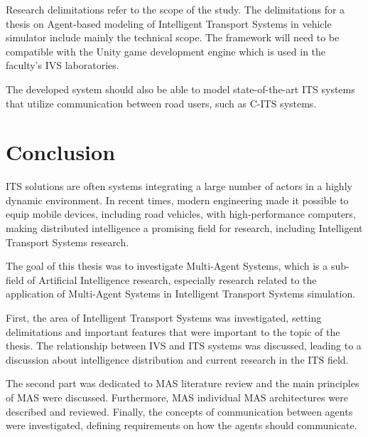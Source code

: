 \documentclass[titlepage, 12pt]{article}
\begin{document}
Research delimitations refer to the scope of the study. The delimitations
for a thesis on Agent-based modeling of Intelligent Transport Systems in vehicle simulator include mainly 
the technical scope. The framework will need to be compatible with the Unity game development engine which 
is used in the faculty's IVS laboratories. 

The developed system should also be able to model state-of-the-art ITS systems that utilize communication between 
road users, such as C-ITS systems. 



















\clearpage

\section{Conclusion}

ITS solutions are often systems integrating a large number of 
actors in a highly dynamic environment. In recent times, modern engineering made it possible 
to equip mobile devices, including road vehicles, with high-performance computers, making 
distributed intelligence a promising field for research, including Intelligent Transport Systems 
research.

The goal of this thesis was to investigate Multi-Agent Systems, which is a sub-field of Artificial Intelligence 
research, especially research related to the application of Multi-Agent Systems in Intelligent Transport Systems 
simulation. 

First, the area of Intelligent Transport Systems was investigated, setting delimitations and important features 
that were important to the topic of the thesis. The relationship between IVS and ITS systems was discussed, leading 
to a discussion about intelligence distribution and current research in the ITS field. 

The second part was dedicated to MAS literature review and the main principles of MAS were discussed. Furthermore, MAS 
individual MAS architectures were described and reviewed. Finally, the concepts of communication between agents were investigated,
defining requirements on how the agents should communicate. 
\end{document}

